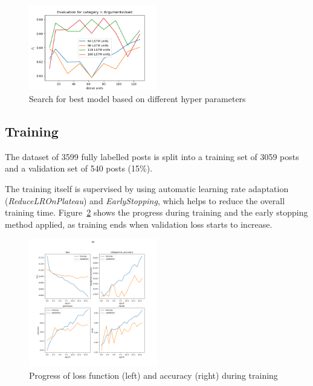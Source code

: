 \documentclass[11pt,a4paper]{article}
\begin{document}
\begin{figure}[h!]
	\centering
	\includegraphics[trim={0.1cm 0cm 0.7cm 0.7cm},clip,width=0.5\textwidth]{img/training_meta}
	\caption{Search for best model based on different hyper parameters}
	\label{fig:hyper_params}
\end{figure}


\subsection{Training}

The dataset of 3599 fully labelled posts is split into a training set of 3059 posts and a validation set of 540 posts (15\%).

The training itself is supervised by using automatic learning rate adaptation (\textit{ReduceLROnPlateau}) and \textit{EarlyStopping}, which helps to reduce the overall training time.
Figure~\ref{fig:training_loss} shows the progress during training and the early stopping method applied, as training ends when validation loss starts to increase.

\begin{figure}[h!]
	\centering
	\includegraphics[trim={1.4cm 12.4cm 2cm 2.5cm},clip,width=0.5\textwidth]{img/training_All_17}
	\caption{Progress of loss function (left) and accuracy (right) during training}
	\label{fig:training_loss}
\end{figure}
\end{document}
